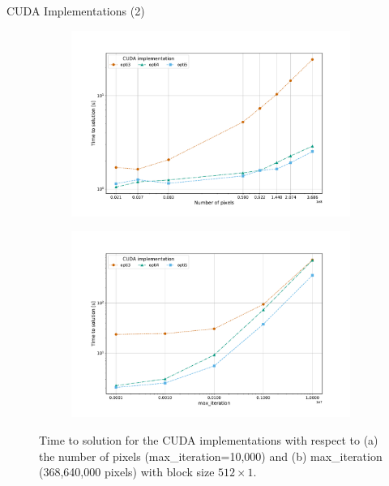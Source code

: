 \documentclass[10pt]{beamer}
\begin{document}
\begin{frame}{CUDA Implementations (2)}
	
\begin{figure}
	\begin{subfigure}{.6\textwidth}
		\centering
		\hspace{-2cm}
		\includegraphics[width=.98\linewidth, clip, trim={1.5cm 1cm 2.5cm 2cm}]{cuda-optis-px.pdf}
		\caption{} 
		\label{fig:cuda-optis-px}
	\end{subfigure}%
	\begin{subfigure}{.6\textwidth}
		\centering
		\hspace{-2.5cm}
		\includegraphics[width=.98\linewidth, clip, trim={1.5cm 1cm 2.5cm 2cm}]{cuda-optis-maxiter.pdf}
		\caption{} 
		\label{fig:cuda-optis-maxiter}
	\end{subfigure}
	\vspace{-0.4cm}
	\caption{Time to solution for the CUDA implementations with respect to (a) the number of pixels (max\_iteration=10,000) and (b) max\_iteration (368,640,000 pixels) with block size $512\times1$.}
	\label{fig:cuda-optis}
\end{figure}
	
\end{frame}
\end{document}
